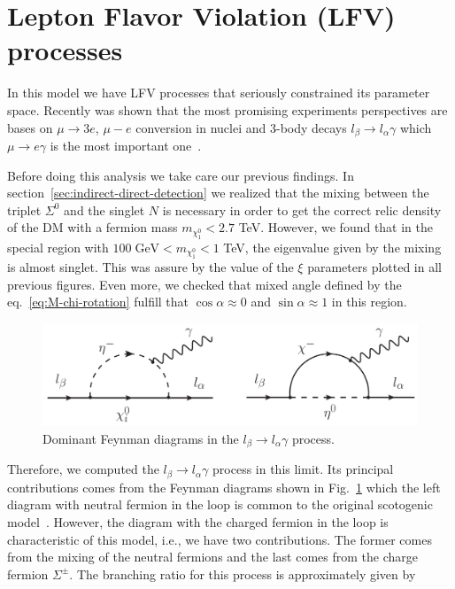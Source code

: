 \documentclass[12pt,letterpaper]{article}
\begin{document}
\section{Lepton Flavor Violation (LFV) processes}
\label{sec:LFV}

In this model we have LFV processes that seriously constrained its parameter space. Recently was shown that the most promising experiments perspectives are bases on $\mu\rightarrow 3 e$, $\mu - e$ conversion in nuclei and 3-body decays $l_{\beta}\rightarrow l_{\alpha}\gamma$ which $\mu\rightarrow e\gamma$ is the most important one~\cite{Rocha-Moran:2016enp}. 

Before doing this analysis we take care our previous findings. In section~\ref{sec:indirect-direct-detection} we realized that the mixing between the triplet $\Sigma^0$ and the singlet $N$ is necessary in order to get the correct relic density of the DM with a fermion mass $m_{\chi^0_1} < 2.7$ TeV. However, we found that in the special region with $100\; \text{GeV} < m_{\chi^0_1} < 1$ TeV, the eigenvalue given by the mixing is almost singlet. This was assure by the value of the $\xi$ parameters plotted in all previous figures. 
Even more, we checked that mixed angle defined by the eq.~\ref{eq:M-chi-rotation} fulfill that $\cos\alpha\approx 0$ and $\sin\alpha\approx 1$ in this region. 
%
\begin{figure}
\begin{center}
\includegraphics[scale=0.55]{LFV-diagrams}
\caption{Dominant Feynman diagrams in the $l_{\beta}\rightarrow l_{\alpha}\gamma$ process.}
\label{fig:mu-e-gamma}
\end{center}
\end{figure}
%
Therefore, we computed the $l_{\beta}\rightarrow l_{\alpha}\gamma$ process in this limit.
Its principal contributions comes from the Feynman diagrams shown in Fig.~\ref{fig:mu-e-gamma} which the left diagram with neutral fermion in the loop is common to the original scotogenic model~\cite{Toma:2013zsa,Ibarra:2016dlb}. However, the diagram with the charged fermion in the loop is characteristic of this model, i.e., we have two contributions. The former comes from the mixing of the neutral fermions and the last comes from the charge fermion $\Sigma^{\pm}$. The branching ratio for this process is approximately given by
\end{document}
